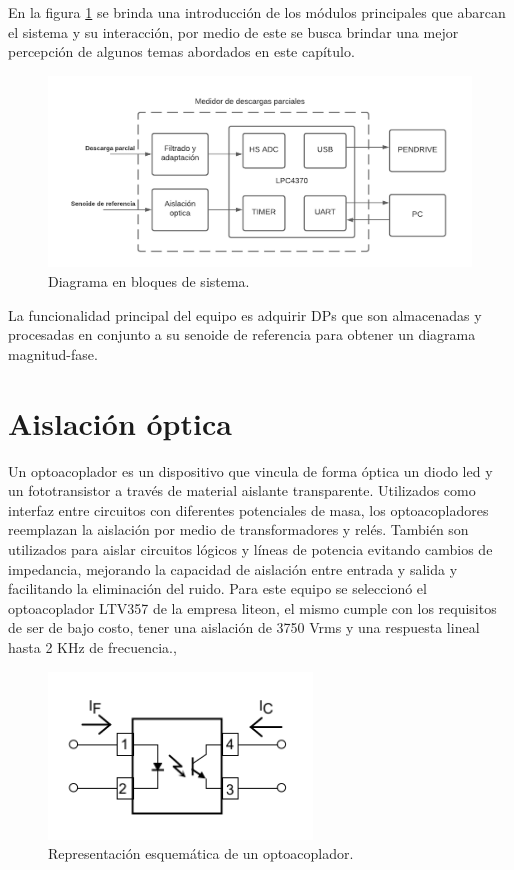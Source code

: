 En la figura \ref{fig:bloques} se brinda una introducción de los módulos principales que abarcan el sistema y su interacción, por medio de este se busca brindar una mejor percepción de algunos temas abordados en este capítulo.

\begin{figure}[ht]
	\centering
	\includegraphics[width=\textwidth]{./Figures/bloques.png}
	\caption{Diagrama en bloques de sistema.}
	\label{fig:bloques}
\end{figure}

La funcionalidad principal del equipo es adquirir DPs que son almacenadas y procesadas en conjunto a su senoide de referencia para obtener un diagrama magnitud-fase.

\section{Aislación óptica}
Un optoacoplador es un dispositivo que vincula de forma óptica un diodo led y un fototransistor a través  de material aislante transparente. Utilizados como interfaz entre circuitos con diferentes potenciales de masa, los optoacopladores reemplazan la aislación por medio de transformadores y relés. También son utilizados para aislar circuitos lógicos y líneas de potencia evitando cambios de impedancia, mejorando la capacidad de aislación entre entrada y salida y facilitando la eliminación del ruido. Para este equipo se seleccionó el optoacoplador LTV357 de la empresa liteon, el mismo cumple con los requisitos de ser de bajo costo, tener una aislación de 3750 Vrms y una respuesta lineal hasta 2 KHz de frecuencia.\citep{opto:appnote},\citep{opto:ltv357}

\begin{figure}[ht]
	\centering
	\includegraphics[width=70mm]{./Figures/opto.png}
	\caption{Representación esquemática de un optoacoplador.}
	\label{fig:opto}
\end{figure}

